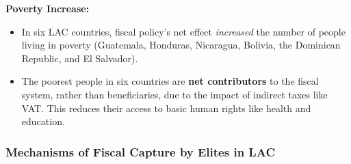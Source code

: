 \documentclass{article}
\begin{document}
    \noindent \textbf{Poverty Increase:}
    \begin{itemize}
        \item In six LAC countries, fiscal policy's net effect
        \textit{increased} the number of people living in poverty (Guatemala,
        Honduras, Nicaragua, Bolivia, the Dominican Republic, and El Salvador).
        \item The poorest people in six countries are
        \textbf{net contributors} to the fiscal system, rather than
        beneficiaries, due to the impact of indirect taxes like VAT. This
        reduces their access to basic human rights like health and education.
    \end{itemize}

    \subsubsection{Mechanisms of Fiscal Capture by Elites in LAC}
\end{document}
